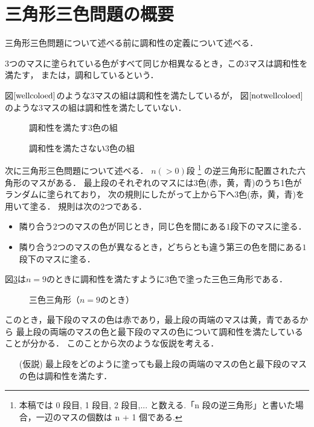 \section{三角形三色問題の概要}
三角形三色問題について述べる前に調和性の定義について述べる．
\begin{dfn}[調和性] \label{dfn:wc}
  $3$つのマスに塗られている色がすべて同じか相異なるとき，この$3$マスは調和性を満たす，
  または，調和しているという．
\end{dfn}
\begin{exm}
  図$\ref{wellcoloed}$のような$3$マスの組は調和性を満たしているが，
  図$\ref{notwellcoloed}$のような$3$マスの組は調和性を満たしていない．
  \begin{figure}[h]
    \centering
    
    \caption{調和性を満たす$3$色の組}
    \label{wellcoloed}
  \end{figure}
  \begin{figure}[h]
    \centering
    
    \caption{調和性を満たさない$3$色の組}
    \label{notwellcoloed}
  \end{figure}
\end{exm}

次に三角形三色問題について述べる．
$n(>0)$段
\footnote{
  本稿では 0 段目, 1 段目, 2 段目,... と数える.「n 段の逆三角形」と書いた場合，一辺のマスの個数は n + 1 個である.
  }
の逆三角形に配置された六角形のマスがある．
最上段のそれぞれのマスには$3$色(赤，黄，青)のうち1色がランダムに塗られており，
次の規則にしたがって上から下へ$3$色(赤，黄，青)を用いて塗る．
規則は次の$2$つである．
\begin{itemize}
  \item
    隣り合う$2$つのマスの色が同じとき，同じ色を間にある$1$段下のマスに塗る．
  \item
    隣り合う$2$つのマスの色が異なるとき，どちらとも違う第三の色を間にある$1$段下のマスに塗る．
\end{itemize}
図\ref{fig:nine_steps}は$n=9$のときに調和性を満たすように3色で塗った三色三角形である．
\begin{figure}[h]
    \centering
    
    \caption{三色三角形（$n=9$のとき）}
    \label{fig:nine_steps}
\end{figure}

このとき，最下段のマスの色は赤であり，最上段の両端のマスは黄，青であるから
最上段の両端のマスの色と最下段のマスの色について調和性を満たしていることが分かる．
このことから次のような仮説を考える．
\begin{itemize}
  \item[(仮説)]
  最上段をどのように塗っても最上段の両端のマスの色と最下段のマスの色は調和性を満たす．
\end{itemize}

